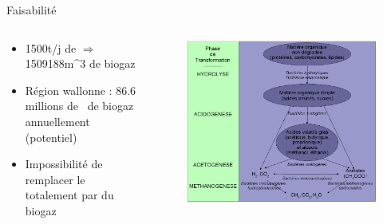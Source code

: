 \documentclass{beamer}
\begin{document}
\begin{frame}{Faisabilité}
	\begin{columns}
		\begin{column}{0.40\textwidth}
		\begin{itemize}
		\item \unit{1500}{t/j} de  $\Longrightarrow$ \unit{1509188}{m^3} de biogaz
		\item Région wallonne : 86.6 millions de \cubic\meter \ de biogaz annuellement (potentiel)
		\item Impossibilité de remplacer le  totalement par du biogaz
		\end{itemize}
		\end{column}
		\begin{column}{0.40\textwidth}
		\begin{figure}
		\includegraphics[scale=0.2]{schema/process_biologique_methanisation_et_biogaz.png}
		\end{figure}
		
		\end{column}
	\end{columns}
\end{frame}
\end{document}
